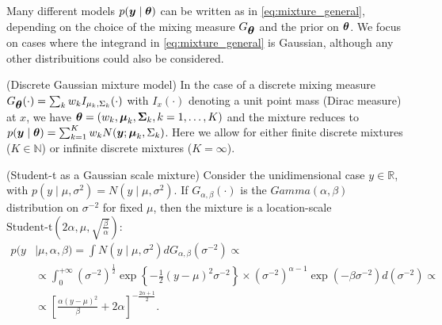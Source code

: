 Many different models $p(\mbox{\boldmath $y$} \mid \mbox{\boldmath $\theta$})$ can be written as in \eqref{eq:mixture_general}, depending on the choice of the mixing measure $G_{\mbox{\boldmath $\theta$}}$ and the prior on $\mbox{\boldmath $\theta$}$. We focus on cases where the integrand in \eqref{eq:mixture_general} is Gaussian, although any other distribuitions could also be considered.

\begin{exem}
(Discrete Gaussian mixture model) In the case of a discrete mixing measure $G_{\mbox{\boldmath $\theta$}}(\cdot) = \sum_k w_kI_{\mu_k, \Sigma_k}(\cdot)$ with $I_{x}(\cdot)$ denoting a unit point mass (Dirac measure) at $x$, we have $\mbox{\boldmath $\theta$} = \left( w_k, \mbox{\boldmath $\mu$}_k, \mbox{\boldmath $\Sigma$}_k, k=1, \ldots, K\right)$ and the mixture reduces to $p(\mbox{\boldmath $y$} \mid \mbox{\boldmath $\theta$}) = \sum^K_{k=1} w_k N(\mbox{\boldmath $y$} ; \mbox{\boldmath $\mu$}_{k}, \Sigma_k)$. Here we allow for either finite discrete mixtures ($K\in \mathbb{N}$) or infinite discrete mixtures ($K=\infty$).
\label{ex:discrete_gaussian_mixture}
\end{exem}

\begin{exem}
(Student-t as a Gaussian scale mixture) Consider the unidimensional case $y\in \mathbb{R}$, with $p(y\mid \mu, \sigma^2) = N(y \mid \mu, \sigma^2).$ If $G_{\alpha, \beta}(\cdot)$ is the $Gamma(\alpha, \beta)$ distribution on $\sigma^{-2}$ for fixed $\mu$, then the mixture is a location-scale $\text{Student-t}\left(2\alpha, \mu, \sqrt{\frac{\beta}{\alpha}} \right):$
\begin{align*}
p(y &\mid \mu, \alpha, \beta) = \int N(y \mid \mu, \sigma^2) dG_{\alpha, \beta}(\sigma^{-2})\propto\\
&\propto \int^{+\infty}_0(\sigma^{-2})^{\frac{1}{2} }\exp\left\{ -\frac{1}{2}(y - \mu)^2 \sigma^{-2}\right\} \times (\sigma^{-2})^{\alpha - 1} \exp(-\beta \sigma^{-2})d(\sigma^{-2})\propto\\
&\propto \left[  \frac{\alpha(y - \mu)^2}{\beta}+ 2 \alpha \right]^{-\frac{2\alpha + 1}{2}}.
\end{align*}
\label{ex:tstudent_mixture}
\end{exem}

